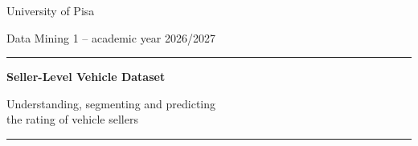 \documentclass[10pt,a4paper,twocolumn]{article}
\begin{document}
\begin{titlepage}
\onecolumn\centering
\vspace*{3.2cm}
{\large University of Pisa\par}\vspace{0.3cm}
{\large Data Mining 1 -- academic year 2026/2027\par}
\vspace{2.4cm}
{\color{accent}\rule{0.8\linewidth}{1.2pt}\par}\vspace{0.6cm}
{\Huge\bfseries Seller-Level Vehicle Dataset\par}\vspace{0.4cm}
{\LARGE Understanding, segmenting and predicting\\[2pt] the rating of vehicle sellers\par}\vspace{0.6cm}
{\color{accent}\rule{0.8\linewidth}{1.2pt}\par}
\vspace{2.4cm}
{\Large\reportauthors\par}
\vspace{1.2cm}
{\large\reportdate\par}
\vfill
\end{titlepage}
\onecolumn
\tableofcontents
\clearpage
\twocolumn
{}







\end{document}
